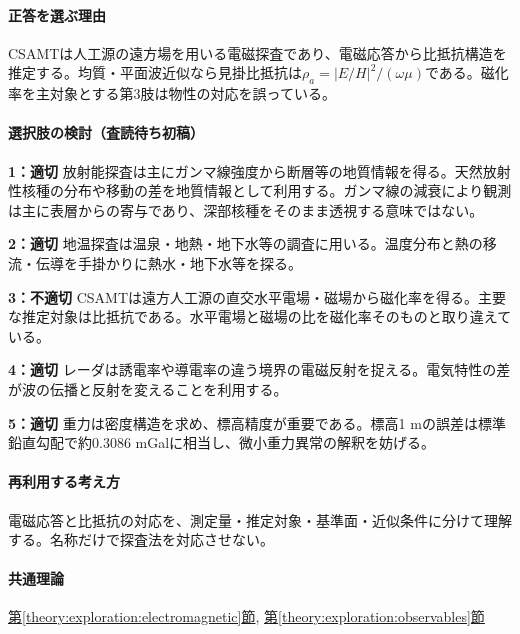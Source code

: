 \paragraph{正答を選ぶ理由} CSAMTは人工源の遠方場を用いる電磁探査であり、電磁応答から比抵抗構造を推定する。均質・平面波近似なら見掛比抵抗は\(\rho_a=|E/H|^2/(\omega\mu)\)である。磁化率を主対象とする第3肢は物性の対応を誤っている。

\paragraph{選択肢の検討（査読待ち初稿）}\mbox{}\par

\noindent\textbf{1：適切} 放射能探査は主にガンマ線強度から断層等の地質情報を得る。天然放射性核種の分布や移動の差を地質情報として利用する。ガンマ線の減衰により観測は主に表層からの寄与であり、深部核種をそのまま透視する意味ではない。\par

\noindent\textbf{2：適切} 地温探査は温泉・地熱・地下水等の調査に用いる。温度分布と熱の移流・伝導を手掛かりに熱水・地下水等を探る。\par

\noindent\textbf{3：不適切} CSAMTは遠方人工源の直交水平電場・磁場から磁化率を得る。主要な推定対象は比抵抗である。水平電場と磁場の比を磁化率そのものと取り違えている。\par

\noindent\textbf{4：適切} レーダは誘電率や導電率の違う境界の電磁反射を捉える。電気特性の差が波の伝播と反射を変えることを利用する。\par

\noindent\textbf{5：適切} 重力は密度構造を求め、標高精度が重要である。標高1 mの誤差は標準鉛直勾配で約0.3086 mGalに相当し、微小重力異常の解釈を妨げる。\par

\paragraph{再利用する考え方} 電磁応答と比抵抗の対応を、測定量・推定対象・基準面・近似条件に分けて理解する。名称だけで探査法を対応させない。

\paragraph{共通理論} \hyperref[theory:exploration:electromagnetic]{第\ref*{theory:exploration:electromagnetic}節}, \hyperref[theory:exploration:observables]{第\ref*{theory:exploration:observables}節}

